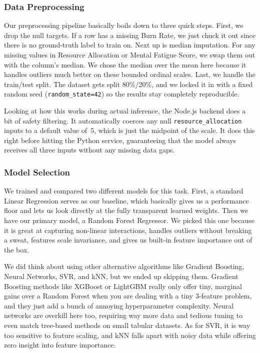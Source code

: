 \documentclass[12pt,a4paper]{article}
\begin{document}
\subsubsection{Data Preprocessing}

Our preprocessing pipeline basically boils down to three quick steps. First, we drop the null targets. If a row has a missing Burn Rate, we just chuck it out since there is no ground-truth label to train on. Next up is median imputation. For any missing values in Resource Allocation or Mental Fatigue Score, we swap them out with the column's median. We chose the median over the mean here because it handles outliers much better on these bounded ordinal scales. Last, we handle the train/test split. The dataset gets split 80\%/20\%, and we locked it in with a fixed random seed (\texttt{random\_state=42}) so the results stay completely reproducible.

Looking at how this works during actual inference, the Node.js backend does a bit of safety filtering. It automatically coerces any null \texttt{resource\_allocation} inputs to a default value of~5, which is just the midpoint of the scale. It does this right before hitting the Python service, guaranteeing that the model always receives all three inputs without any missing data gaps.

\subsubsection{Model Selection}

We trained and compared two different models for this task. First, a standard Linear Regression serves as our baseline, which basically gives us a performance floor and lets us look directly at the fully transparent learned weights. Then we have our primary model, a Random Forest Regressor. We picked this one because it is great at capturing non-linear interactions, handles outliers without breaking a sweat, features scale invariance, and gives us built-in feature importance out of the box.

We did think about using other alternative algorithms like Gradient Boosting, Neural Networks, SVR, and kNN, but we ended up skipping them. Gradient Boosting methods like XGBoost or LightGBM really only offer tiny, marginal gains over a Random Forest when you are dealing with a tiny 3-feature problem, and they just add a bunch of annoying hyperparameter complexity. Neural networks are overkill here too, requiring way more data and tedious tuning to even match tree-based methods on small tabular datasets. As for SVR, it is way too sensitive to feature scaling, and kNN falls apart with noisy data while offering zero insight into feature importance.
\end{document}
